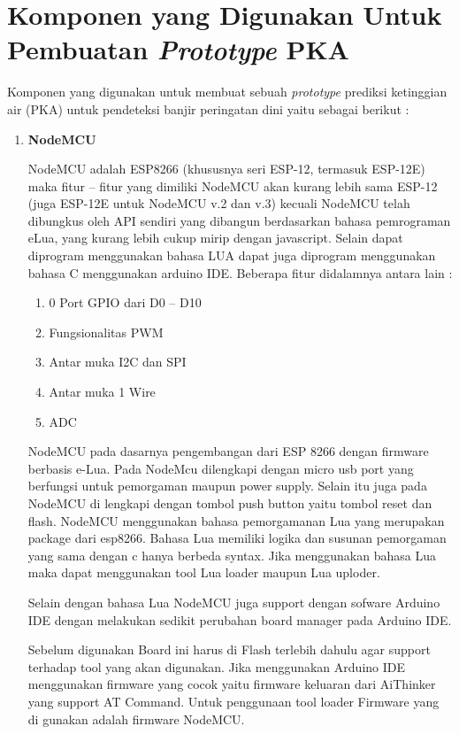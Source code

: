 \section{Komponen yang Digunakan Untuk Pembuatan \textit{Prototype} PKA}
Komponen yang digunakan untuk membuat sebuah \textit{prototype} prediksi ketinggian air (PKA) untuk pendeteksi banjir peringatan dini yaitu sebagai berikut :
\begin{enumerate}
    \item \textbf{NodeMCU}
   \par  NodeMCU adalah ESP8266 (khususnya seri ESP-12, termasuk ESP-12E) maka fitur – fitur yang dimiliki NodeMCU akan kurang lebih sama ESP-12 (juga ESP-12E untuk NodeMCU v.2 dan v.3) kecuali NodeMCU telah dibungkus oleh API sendiri yang dibangun berdasarkan bahasa pemrograman eLua, yang kurang lebih cukup mirip dengan javascript. Selain dapat diprogram menggunakan bahasa LUA dapat juga diprogram menggunakan bahasa C menggunakan arduino IDE. Beberapa fitur didalamnya antara lain : 
    \begin{enumerate}
        \item 0 Port GPIO dari D0 – D10
        \item Fungsionalitas PWM
        \item Antar muka I2C dan SPI
        \item Antar muka 1 Wire
        \item ADC
    \end{enumerate}
\par NodeMCU pada dasarnya pengembangan dari ESP 8266
dengan firmware berbasis e-Lua. Pada NodeMcu dilengkapi dengan micro usb port yang berfungsi untuk pemorgaman maupun power supply. Selain itu juga pada NodeMCU di lengkapi dengan tombol push button yaitu tombol reset dan flash. NodeMCU menggunakan bahasa pemorgamanan Lua yang merupakan package dari esp8266. Bahasa Lua memiliki logika dan susunan pemorgaman yang sama dengan c hanya berbeda syntax. Jika menggunakan bahasa Lua maka dapat menggunakan tool Lua loader maupun Lua uploder.
\par Selain dengan bahasa Lua NodeMCU juga support dengan sofware
Arduino IDE dengan melakukan sedikit perubahan board manager pada
Arduino IDE.
\par Sebelum digunakan Board ini harus di Flash terlebih dahulu agar support terhadap tool yang akan digunakan. Jika menggunakan Arduino IDE menggunakan firmware yang cocok yaitu firmware keluaran dari AiThinker yang support AT Command. Untuk penggunaan tool loader Firmware yang di gunakan adalah firmware NodeMCU.
    

\end{enumerate}
